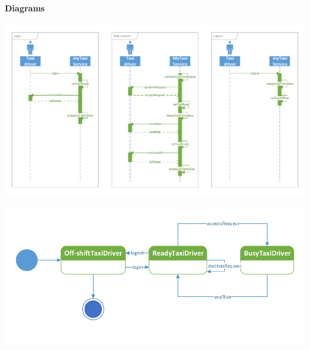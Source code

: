 	\paragraph{Diagrams}
		\begin{center}
			\includegraphics[width=\textwidth]{diagrams/availability}
		\end{center}
		\begin{center}
			\includegraphics[width=\textwidth]{diagrams/availability_state}
		\end{center}
		
